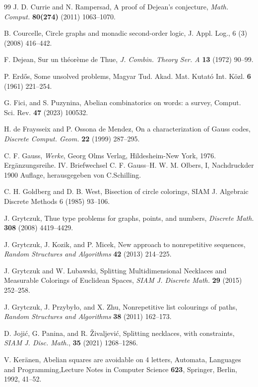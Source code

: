 \documentclass[12pt]{amsart}
\theoremstyle{plain}
\numberwithin{equation}{section}
\begin{document}
\begin{thebibliography}{99}
 J. D. Currie and N. Rampersad, A proof of Dejean's conjecture, {\it Math. Comput.} {\bf 80(274)} (2011) 1063--1070.

 B. Courcelle, Circle graphs and monadic second-order logic, J. Appl. Log., 6 (3) (2008) 416--442.

 F. Dejean, Sur un th\'{e}or\`{e}me de Thue, {\it J. Combin. Theory Ser. A} {\bf 13} (1972) 90--99.

 P. Erd\H{o}s, Some unsolved problems, Magyar Tud. Akad. Mat. Kutató Int. K\"ozl. {\bf6} (1961) 221--254.

 G. Fici, and S. Puzynina, Abelian combinatorics on words: a survey, Comput. Sci. Rev. {\bf47} (2023) 100532.

 H. de Fraysseix and P. Ossona de Mendez, On a characterization of Gauss codes, {\it Discrete Comput. Geom.} {\bf 22} (1999) 287--295.

 C. F. Gauss, \emph{Werke}, Georg Olms Verlag, Hildesheim-New York, 1976. Ergänzungsreihe. IV. Briefwechsel C. F. Gauss–H. W. M. Olbers, I, Nachdruckder 1900 Auflage, herausgegeben von C.Schilling.

 C. H. Goldberg and D. B. West, Bisection of circle colorings, SIAM J. Algebraic Discrete Methods 6 (1985) 93--106.

 J. Grytczuk, Thue type problems for graphs, points, and numbers, {\it Discrete Math.} {\bf 308} (2008) 4419--4429.

 J. Grytczuk, J. Kozik, and P. Micek, New  approach  to  nonrepetitive  sequences, {\it Random Structures and Algorithms} {\bf 42} (2013) 214--225.

 J. Grytczuk and W. Lubawski, Splitting Multidimensional Necklaces and Measurable Colorings of Euclidean Spaces, {\it SIAM J. Discrete Math.} {\bf 29} (2015) 252--258.

 J. Grytczuk, J. Przyby\l o, and X. Zhu, Nonrepetitive list colourings of paths, {\it Random Structures and  Algorithms} {\bf 38} (2011) 162--173.

 D. Joji\'c, G. Panina, and R. \v{Z}ivaljevi\'c, Splitting necklaces, with constraints, {\it SIAM J. Disc. Math.}, {\bf 35} (2021) 1268--1286. 

 V. Ker\"anen, Abelian squares are avoidable on 4 letters, Automata, Languages and Programming,Lecture Notes in Computer Science {\bf623}, Springer, Berlin, 1992, 41--52.


\end{thebibliography}
\end{document}
